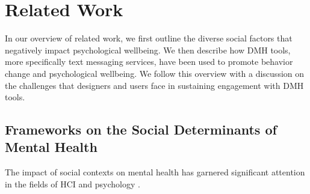 \section{Related Work}

In our overview of related work, we first outline the diverse social factors that negatively impact psychological wellbeing.
We then describe how DMH tools, more specifically text messaging services, have been used to promote behavior change and psychological wellbeing.
We follow this overview with a discussion on the challenges that designers and users face in sustaining engagement with DMH tools.


\subsection{Frameworks on the Social Determinants of Mental Health}
The impact of social contexts on mental health has garnered significant attention in the fields of HCI and psychology \cite{alegria2018social, allen2014social, bhattacharjee2021understanding, lewis2019cultural, slavich2023social, tachtler2021unaccompanied, lattie2020designing, bhattacharjee2023integrating, slavich2020social}. 



